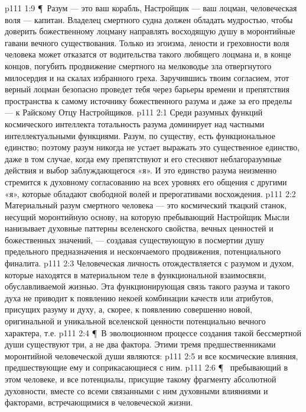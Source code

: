 \vs p111 1:9 \P\ Разум --- это ваш корабль, Настройщик --- ваш лоцман, человеческая воля --- капитан. Владелец смертного судна должен обладать мудростью, чтобы доверить божественному лоцману направлять восходящую душу в моронтийные гавани вечного существования. Только из эгоизма, лености и греховности воля человека может отказатся от водительства такого любящего лоцмана и, в конце концов, погубить продвижение смертного на мелководье зла отвергнутого милосердия и на скалах избранного греха. Заручившись твоим согласием, этот верный лоцман безопасно проведет тебя через барьеры времени и препятствия пространства к самому источнику божественного разума и даже за его пределы --- к Райскому Отцу Настройщиков.
\vs p111 2:1 Среди разумных функций космического интеллекта тотальность разума доминирует над частными интеллектуальными функциями. Разум, по существу, есть функциональное единство; поэтому разум никогда не устает выражать это существенное единство, даже в том случае, когда ему препятствуют и его стесняют неблагоразумные действия и выбор заблуждающегося «я». И это единство разума неизменно стремится к духовному согласованию на всех уровнях его общения с другими «я», которые обладают свободной волей и прерогативами восхождения.
\vs p111 2:2 Материальный разум смертного человека --- это космический ткацкий станок, несущий моронтийную основу, на которую пребывающий Настройщик Мысли нанизывает духовные паттерны вселенского свойства, вечных ценностей и божественных значений, --- создавая существующую в посмертии душу предельного предназначения и нескончаемого продвижения, потенциального финалита.
\vs p111 2:3 Человеческая личность отождествляется с разумом и духом, которые находятся в материальном теле в функциональной взаимосвязи, обуславливаемой жизнью. Эта функционирующая связь такого разума и такого духа не приводит к появлению некоей комбинации качеств или атрибутов, присущих разуму и духу, а, скорее, к появлению совершенно новой, оригинальной и уникальной вселенской ценности потенциально вечного характера, т.е. 
\vs p111 2:4 \P\ В эволюционном процессе создания такой бессмертной души существуют три, а не два фактора. Этими тремя предшественниками моронтийной человеческой души являются:
\vs p111 2:5 \bibnobreakspace {} и все космические влияния, предшествующие ему и соприкасающиеся с ним.
\vs p111 2:6 \P\ \bibnobreakspace {} пребывающий в этом человеке, и все потенциалы, присущие такому фрагменту абсолютной духовности, вместе со всеми связанными с ним духовными влияниями и факторами, встречающимися в человеческой жизни.
